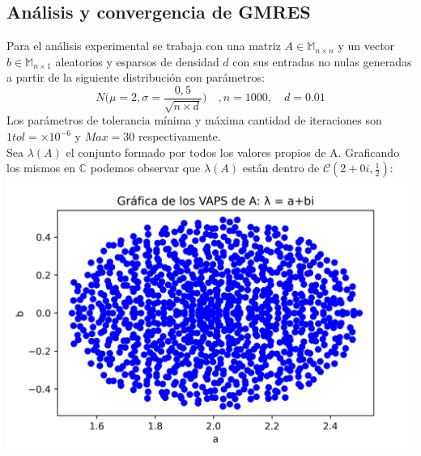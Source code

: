 \documentclass{endm}
\begin{document}
\subsection{An\'alisis y convergencia de GMRES}

Para el análisis experimental se trabaja con una matriz $A \in \mathbb{M}_{n \times n}$ y un vector $b \in \mathbb{M}_{n \times 1}$ aleatorios y esparsos de densidad $d$ con sus entradas no nulas generadas a partir de la siguiente distribución con parámetros:\\
\begin{equation*}
    N \Bigg(\mu=2,\sigma=\frac{0,5}{\sqrt{n \times d}} \Bigg) \quad , n=1000,\quad d =0.01
\end{equation*}
Los parámetros de tolerancia mínima y máxima cantidad de iteraciones son $1tol = \times 10^{-6}$ y $Max =30$ respectivamente.
\\
Sea $\lambda(A)$ el conjunto formado por todos los valores propios de A. Graficando los mismos en $\mathbb{C}$ podemos observar que $\lambda(A)$ están dentro de $\mathscr{C}(2+0i,\frac{1}{2})$:
\\
\includegraphics[scale = 0.9]{vaps.png}\\
\end{document}
